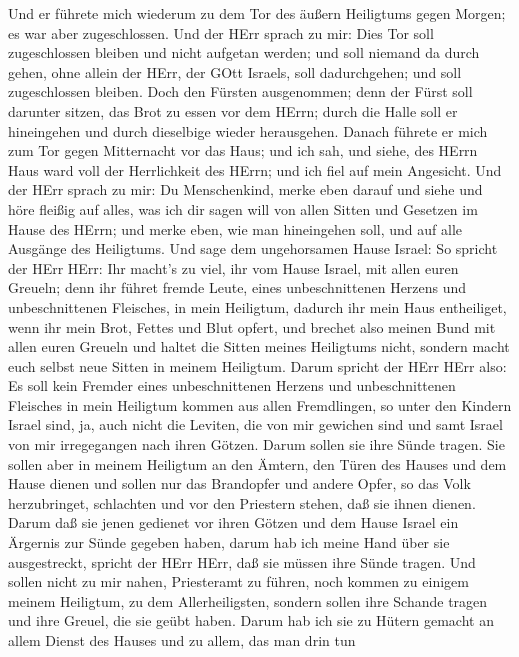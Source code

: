  Und er führete mich wiederum zu dem Tor des äußern
Heiligtums gegen Morgen; es war aber zugeschlossen.  Und der
HErr sprach zu mir: Dies Tor soll zugeschlossen bleiben und nicht
aufgetan werden; und soll niemand da durch gehen, ohne allein der HErr,
der GOtt Israels, soll dadurchgehen; und soll zugeschlossen bleiben.
 Doch den Fürsten ausgenommen; denn der Fürst soll darunter
sitzen, das Brot zu essen vor dem HErrn; durch die Halle soll er
hineingehen und durch dieselbige wieder herausgehen.  Danach
führete er mich zum Tor gegen Mitternacht vor das Haus; und ich sah, und
siehe, des HErrn Haus ward voll der Herrlichkeit des HErrn; und ich fiel
auf mein Angesicht.  Und der HErr sprach zu mir: Du
Menschenkind, merke eben darauf und siehe und höre fleißig auf alles,
was ich dir sagen will von allen Sitten und Gesetzen im Hause des HErrn;
und merke eben, wie man hineingehen soll, und auf alle Ausgänge des
Heiligtums.  Und sage dem ungehorsamen Hause Israel: So
spricht der HErr HErr: Ihr macht's zu viel, ihr vom Hause Israel, mit
allen euren Greueln;  denn ihr führet fremde Leute, eines
unbeschnittenen Herzens und unbeschnittenen Fleisches, in mein
Heiligtum, dadurch ihr mein Haus entheiliget, wenn ihr mein Brot, Fettes
und Blut opfert, und brechet also meinen Bund mit allen euren Greueln
 und haltet die Sitten meines Heiligtums nicht, sondern
macht euch selbst neue Sitten in meinem Heiligtum.  Darum
spricht der HErr HErr also: Es soll kein Fremder eines unbeschnittenen
Herzens und unbeschnittenen Fleisches in mein Heiligtum kommen aus allen
Fremdlingen, so unter den Kindern Israel sind,  ja, auch
nicht die Leviten, die von mir gewichen sind und samt Israel von mir
irregegangen nach ihren Götzen. Darum sollen sie ihre Sünde tragen.
 Sie sollen aber in meinem Heiligtum an den Ämtern, den
Türen des Hauses und dem Hause dienen und sollen nur das Brandopfer und
andere Opfer, so das Volk herzubringet, schlachten und vor den Priestern
stehen, daß sie ihnen dienen.  Darum daß sie jenen gedienet
vor ihren Götzen und dem Hause Israel ein Ärgernis zur Sünde gegeben
haben, darum hab ich meine Hand über sie ausgestreckt, spricht der HErr
HErr, daß sie müssen ihre Sünde tragen.  Und sollen nicht
zu mir nahen, Priesteramt zu führen, noch kommen zu einigem meinem
Heiligtum, zu dem Allerheiligsten, sondern sollen ihre Schande tragen
und ihre Greuel, die sie geübt haben.  Darum hab ich sie zu
Hütern gemacht an allem Dienst des Hauses und zu allem, das man drin tun
